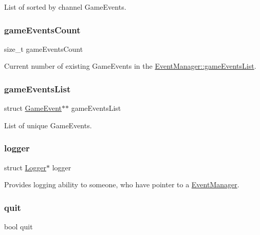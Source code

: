 List of sorted by channel Game\+Events. \hypertarget{struct_event_manager_ae586848fac4574f9c630a1b66a3b8c6c}{}\label{struct_event_manager_ae586848fac4574f9c630a1b66a3b8c6c} 
\subsubsection{\texorpdfstring{game\+Events\+Count}{gameEventsCount}}
{\footnotesize\ttfamily size\+\_\+t game\+Events\+Count}

Current number of existing Game\+Events in the \hyperlink{struct_event_manager_aa2b0ad79c0a87b310b5adf8feaf9ffd4}{Event\+Manager\+::game\+Events\+List}. \hypertarget{struct_event_manager_aa2b0ad79c0a87b310b5adf8feaf9ffd4}{}\label{struct_event_manager_aa2b0ad79c0a87b310b5adf8feaf9ffd4} 
\subsubsection{\texorpdfstring{game\+Events\+List}{gameEventsList}}
{\footnotesize\ttfamily struct \hyperlink{struct_game_event}{Game\+Event}$\ast$$\ast$ game\+Events\+List}

List of unique Game\+Events. \hypertarget{struct_event_manager_af4d650f26e6e1a4b53c751abc1eff45e}{}\label{struct_event_manager_af4d650f26e6e1a4b53c751abc1eff45e} 
\subsubsection{\texorpdfstring{logger}{logger}}
{\footnotesize\ttfamily struct \hyperlink{struct_logger}{Logger}$\ast$ logger}

Provides logging ability to someone, who have pointer to a \hyperlink{struct_event_manager}{Event\+Manager}. \hypertarget{struct_event_manager_ac746fa6ad48d19984a159f14bec028a3}{}\label{struct_event_manager_ac746fa6ad48d19984a159f14bec028a3} 
\subsubsection{\texorpdfstring{quit}{quit}}
{\footnotesize\ttfamily bool quit}

